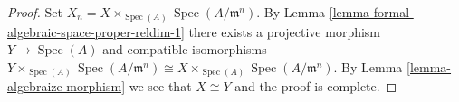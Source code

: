 \documentclass[10pt,a4paper]{amsart}
\theoremstyle{plain}
\theoremstyle{definition}
\theoremstyle{remark}
\numberwithin{equation}{subsection}
\def\Spec{\mathop{\mathrm{Spec}}}
\begin{document}
\begin{proof}
Set $X_n = X \times_{\Spec(A)} \Spec(A/\mathfrak m^n)$.
By Lemma \ref{lemma-formal-algebraic-space-proper-reldim-1}
there exists a projective morphism $Y \to \Spec(A)$
and compatible isomorphisms
$Y \times_{\Spec(A)} \Spec(A/\mathfrak m^n) \cong
X \times_{\Spec(A)} \Spec(A/\mathfrak m^n)$.
By Lemma \ref{lemma-algebraize-morphism}
we see that $X \cong Y$ and the proof is complete.
\end{proof}
\end{document}
